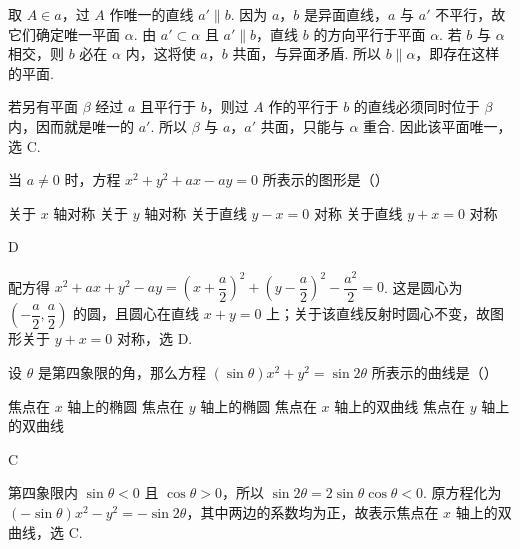 \documentclass[UTF8,a4paper,oneside,11pt]{ctexbook}
\begin{document}
\begin{solution}
取 \(A\in a\)，过 \(A\) 作唯一的直线 \(a'\parallel b\). 因为 \(a\)，\(b\) 是异面直线，\(a\) 与 \(a'\) 不平行，故它们确定唯一平面 \(\alpha\). 由 \(a'\subset\alpha\) 且 \(a'\parallel b\)，直线 \(b\) 的方向平行于平面 \(\alpha\). 若 \(b\) 与 \(\alpha\) 相交，则 \(b\) 必在 \(\alpha\) 内，这将使 \(a\)，\(b\) 共面，与异面矛盾. 所以 \(b\parallel\alpha\)，即存在这样的平面.

若另有平面 \(\beta\) 经过 \(a\) 且平行于 \(b\)，则过 \(A\) 作的平行于 \(b\) 的直线必须同时位于 \(\beta\) 内，因而就是唯一的 \(a'\). 所以 \(\beta\) 与 \(a\)，\(a'\) 共面，只能与 \(\alpha\) 重合. 因此该平面唯一，选 C.
\end{solution}

\begin{problem}
当 \(a \neq 0\) 时，方程 \(x^2 + y^2 + ax - ay = 0\) 所表示的图形是（\quad）

\choices
    {关于 \(x\) 轴对称}
    {关于 \(y\) 轴对称}
    {关于直线 \(y - x = 0\) 对称}
    {关于直线 \(y + x = 0\) 对称}
\end{problem}

\begin{answer}
D
\end{answer}

\begin{solution}
配方得 \(x^2+ax+y^2-ay=\left(x+\dfrac a2\right)^2+\left(y-\dfrac a2\right)^2-\dfrac{a^2}{2}=0\). 这是圆心为 \(\left(-\dfrac a2,\dfrac a2\right)\) 的圆，且圆心在直线 \(x+y=0\) 上；关于该直线反射时圆心不变，故图形关于 \(y+x=0\) 对称，选 D.
\end{solution}

\begin{problem}
设 \(\theta\) 是第四象限的角，那么方程 \((\sin \theta)x^2 + y^2 = \sin 2\theta\) 所表示的曲线是（\quad）

\choices
    {焦点在 \(x\) 轴上的椭圆}
    {焦点在 \(y\) 轴上的椭圆}
    {焦点在 \(x\) 轴上的双曲线}
    {焦点在 \(y\) 轴上的双曲线}
\end{problem}

\begin{answer}
C
\end{answer}

\begin{solution}
第四象限内 \(\sin\theta<0\) 且 \(\cos\theta>0\)，所以 \(\sin2\theta=2\sin\theta\cos\theta<0\). 原方程化为
\(\left(-\sin\theta\right)x^2-y^2=-\sin2\theta\)，其中两边的系数均为正，故表示焦点在 \(x\) 轴上的双曲线，选 C.
\end{solution}
\end{document}
